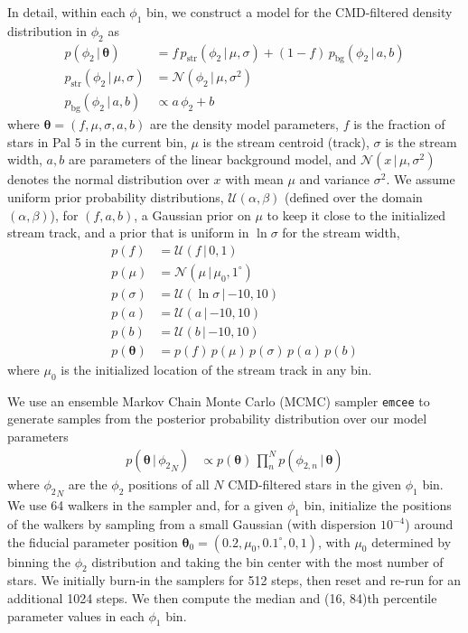 \documentclass[twocolumn]{aastex62}
\newcommand{\bs}[1]{\boldsymbol{#1}}
\newcommand{\given}{\,|\,}
\newcommand{\sa}[1]{{\color{magenta} SP: #1}}
\begin{document}
In detail, within each $\phi_1$ bin, we construct a model for the CMD-filtered density distribution in $\phi_2$ as
\begin{align}
    p(\phi_2 \given \bs{\theta}) &=
        f \, p_{\textrm{str}}(\phi_2 \given \mu, \sigma) +
        (1-f) \, p_{\textrm{bg}}(\phi_2 \given a, b) \\
    p_{\textrm{str}}(\phi_2 \given \mu, \sigma) &=
        \mathcal{N}(\phi_2 \given \mu, \sigma^2)\\
    p_{\textrm{bg}}(\phi_2 \given a, b) &\propto
        a \, \phi_2 + b
\end{align}
where $\bs{\theta} = (f, \mu, \sigma, a, b)$ are the density model parameters, $f$ is the fraction of stars in Pal 5 in the current bin, $\mu$ is the stream centroid (track), $\sigma$ is the stream width, $a, b$ are parameters of the linear background model, and $\mathcal{N}(x \given \mu, \sigma^2)$ denotes the normal distribution over $x$ with mean $\mu$ and variance $\sigma^2$.
We assume uniform prior probability distributions, $\mathcal{U}(\alpha, \beta)$ (defined over the domain $(\alpha, \beta)$), for $(f, a, b)$, a Gaussian prior on $\mu$ to keep it close to the initialized stream track, and a prior that is uniform in $\ln \sigma$ for the stream width,
\begin{align}
    p(f) &= \mathcal{U}(f \given 0, 1)\\
    p(\mu) &= \mathcal{N}(\mu \given \mu_0, 1^\circ)\\
    p(\sigma) &= \mathcal{U}(\ln\sigma \given {-10}, 10)\\
    p(a) &= \mathcal{U}(a \given {-10}, 10)\\
    p(b) &= \mathcal{U}(b \given {-10}, 10)\\
    p(\bs{\theta}) &= p(f) \, p(\mu) \, p(\sigma) \, p(a) \, p(b)
\end{align}
where $\mu_0$ is the initialized location of the stream track in any bin.

We use an ensemble Markov Chain Monte Carlo (MCMC) sampler \texttt{emcee} \citep{Foreman-Mackey:2013} to generate samples from the posterior probability distribution over our model parameters
\begin{align}
    p(\bs{\theta} \given {\phi_2}_N) &\propto
        p(\bs{\theta}) \, \prod_n^N p(\phi_{2, n} \given \bs{\theta})
\end{align}
where ${\phi_2}_N$ are the $\phi_2$ positions of all $N$ CMD-filtered stars in the given $\phi_1$ bin.
We use 64 walkers in the sampler and, for a given $\phi_1$ bin, initialize the positions of the walkers by sampling from a small Gaussian (with dispersion $10^{-4}$) around the fiducial parameter position $\bs{\theta}_0 = (0.2, \mu_0, 0.1^\circ, 0, 1)$, with $\mu_0$ determined by binning the $\phi_2$ distribution and taking the bin center with the most number of stars.
We initially burn-in the samplers for 512 steps, then reset and re-run for an additional 1024 steps.
We then compute the median and (16, 84)th percentile parameter values in each $\phi_1$ bin.
\end{document}
